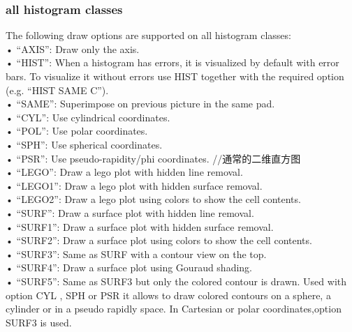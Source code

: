 \documentclass[11pt,a4paper,titlepage]{article}
\begin{document}
{\subsubsection{all histogram classes}
The following draw options are supported on all histogram classes:\\
• “AXIS”: Draw only the axis.\\
• “HIST”: When a histogram has errors, it is visualized by default with error bars. To visualize it without errors use HIST together with the required option (e.g. “HIST SAME C”).\\
• “SAME”: Superimpose on previous picture in the same pad.\\
• “CYL”: Use cylindrical coordinates.\\
• “POL”: Use polar coordinates.\\
• “SPH”: Use spherical coordinates.\\
• “PSR”: Use pseudo-rapidity/phi coordinates.  //通常的二维直方图\\
• “LEGO”: Draw a lego plot with hidden line removal.\\
• “LEGO1”: Draw a lego plot with hidden surface removal.\\
• “LEGO2”: Draw a lego plot using colors to show the cell contents.\\
• “SURF”: Draw a surface plot with hidden line removal.\\
• “SURF1”: Draw a surface plot with hidden surface removal.\\
• “SURF2”: Draw a surface plot using colors to show the cell contents.\\
• “SURF3”: Same as SURF with a contour view on the top.\\
• “SURF4”: Draw a surface plot using Gouraud shading.\\
• “SURF5”: Same as SURF3 but only the colored contour is drawn. Used with option CYL , SPH or PSR it allows to draw colored contours on a sphere, a cylinder or in a pseudo rapidly space. In Cartesian or polar coordinates,option SURF3 is used.\\

}
\end{document}
